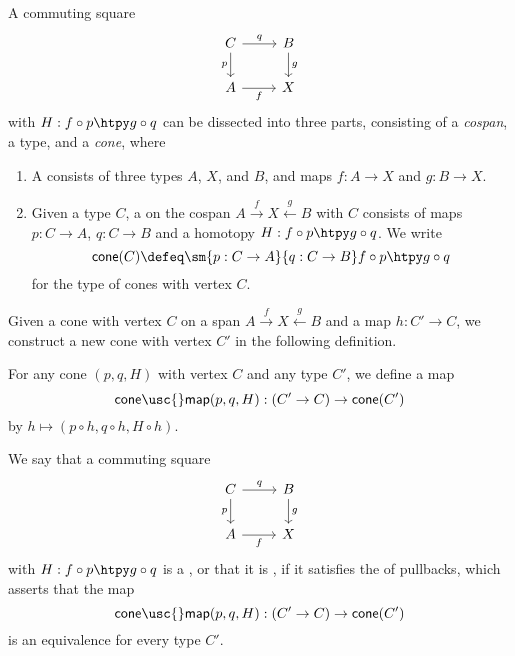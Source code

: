 \begin{defn}
A commuting square
\begin{equation*}
\begin{tikzcd}
C \arrow[r,"q"] \arrow[d,swap,"p"] & B \arrow[d,"g"] \\
A \arrow[r,swap,"f"] & X
\end{tikzcd}
\end{equation*}
with $H:f\circ p\htpy g\circ q$ can be dissected into three parts, consisting of a \emph{cospan}, a type, and a \emph{cone}, where
\begin{enumerate}
\item A  consists of three types $A$, $X$, and $B$, and maps $f:A\to X$ and $g:B\to X$.
\item Given a type $C$, a  on the cospan $A \stackrel{f}{\rightarrow} X \stackrel{g}{\leftarrow} B$ with  $C$ consists of maps $p:C\to A$, $q:C\to B$ and a homotopy $H:f\circ p\htpy g\circ q$. We write
\begin{equation*}
\mathsf{cone}(C)\defeq \sm{p:C\to A}{q:C\to B}f\circ p\htpy g\circ q
\end{equation*}
for the type of cones with vertex $C$.
\end{enumerate}
\end{defn}

Given a cone with vertex $C$ on a span $A\stackrel{f}{\rightarrow} X \stackrel{g}{\leftarrow} B$ and a map $h:C'\to C$, we construct a new cone with vertex $C'$ in the following definition.

\begin{defn}
For any cone $(p,q,H)$ with vertex $C$ and any type $C'$, we define a map
\begin{equation*}
\mathsf{cone\usc{}map}(p,q,H):(C'\to C)\to\mathsf{cone}(C')
\end{equation*}
by $h\mapsto (p\circ h,q\circ h,H\circ h)$. 
\end{defn}

\begin{defn}
We say that a commuting square
\begin{equation*}
\begin{tikzcd}
C \arrow[r,"q"] \arrow[d,swap,"p"] & B \arrow[d,"g"] \\
A \arrow[r,swap,"f"] & X
\end{tikzcd}
\end{equation*}
with $H:f\circ p\htpy g\circ q$ is a , or that it is , if it satisfies the  of pullbacks, which asserts that the map
\begin{equation*}
\mathsf{cone\usc{}map}(p,q,H):(C'\to C)\to\mathsf{cone}(C')
\end{equation*}
is an equivalence for every type $C'$. 
\end{defn}

